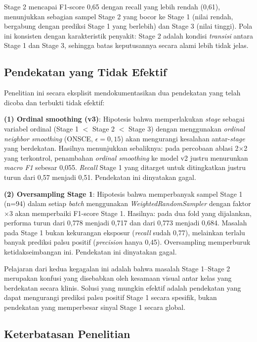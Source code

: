 Stage 2 mencapai F1-score 0,65 dengan recall yang lebih rendah (0,61), menunjukkan sebagian
sampel Stage 2 yang bocor ke Stage 1 (nilai rendah, bergabung dengan prediksi Stage 1 yang
berlebih) dan Stage 3 (nilai tinggi). Pola ini konsisten dengan karakteristik penyakit: Stage 2
adalah kondisi \textit{transisi} antara Stage 1 dan Stage 3, sehingga batas keputusannya
secara alami lebih tidak jelas.

\subsection{Pendekatan yang Tidak Efektif}

Penelitian ini secara eksplisit mendokumentasikan dua pendekatan yang telah dicoba dan terbukti
tidak efektif:

\textbf{(1) Ordinal smoothing (v3)}: Hipotesis bahwa memperlakukan \textit{stage} sebagai
variabel ordinal (Stage 1 $<$ Stage 2 $<$ Stage 3) dengan menggunakan \textit{ordinal neighbor
smoothing} (ONSCE, $\epsilon = 0{,}15$) akan mengurangi kesalahan antar-\textit{stage} yang
berdekatan. Hasilnya menunjukkan sebaliknya: pada percobaan ablasi 2$\times$2 yang terkontrol,
penambahan \textit{ordinal smoothing} ke model v2 justru menurunkan \textit{macro F1} sebesar
0,055. \textit{Recall} Stage 1 yang ditarget untuk ditingkatkan justru turun dari 0,57 menjadi
0,51. Pendekatan ini dinyatakan gagal.

\textbf{(2) Oversampling Stage 1}: Hipotesis bahwa memperbanyak sampel Stage 1 (n=94) dalam
setiap \textit{batch} menggunakan \textit{WeightedRandomSampler} dengan faktor $\times$3 akan
memperbaiki F1-score Stage 1. Hasilnya: pada dua fold yang dijalankan, performa turun dari
0,778 menjadi 0,717 dan dari 0,773 menjadi 0,684. Masalah pada Stage 1 bukan kekurangan
eksposur (\textit{recall} sudah 0,77), melainkan terlalu banyak prediksi palsu positif
(\textit{precision} hanya 0,45). Oversampling memperburuk ketidakseimbangan ini. Pendekatan
ini dinyatakan gagal.

Pelajaran dari kedua kegagalan ini adalah bahwa masalah Stage 1--Stage 2 merupakan konfusi
yang disebabkan oleh kesamaan visual antar kelas yang berdekatan secara klinis. Solusi yang
mungkin efektif adalah pendekatan yang dapat mengurangi prediksi palsu positif Stage 1 secara
spesifik, bukan pendekatan yang memperbesar sinyal Stage 1 secara global.

\subsection{Keterbatasan Penelitian}

